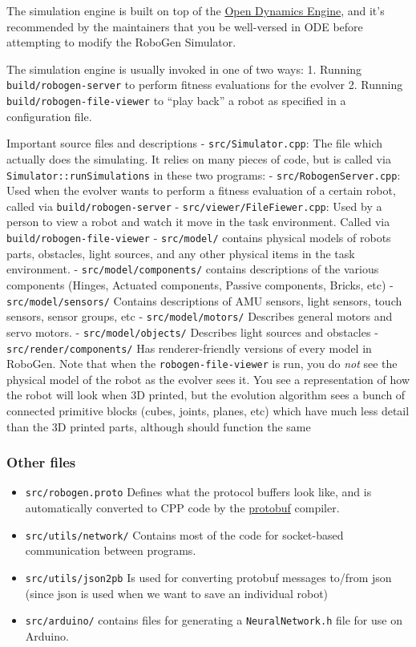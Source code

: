 The simulation engine is built on top of the
\href{http://www.ode.org/}{Open Dynamics Engine}, and it's recommended
by the maintainers that you be well-versed in ODE before attempting to
modify the RoboGen Simulator.

The simulation engine is usually invoked in one of two ways: 1. Running
\texttt{build/robogen-server} to perform fitness evaluations for the
evolver 2. Running \texttt{build/robogen-file-viewer} to ``play back'' a
robot as specified in a configuration file.

Important source files and descriptions - \texttt{src/Simulator.cpp}:
The file which actually does the simulating. It relies on many pieces of
code, but is called via \texttt{Simulator::runSimulations} in these two
programs: - \texttt{src/RobogenServer.cpp}: Used when the evolver wants
to perform a fitness evaluation of a certain robot, called via
\texttt{build/robogen-server} - \texttt{src/viewer/FileFiewer.cpp}: Used
by a person to view a robot and watch it move in the task environment.
Called via \texttt{build/robogen-file-viewer} - \texttt{src/model/}
contains physical models of robots parts, obstacles, light sources, and
any other physical items in the task environment. -
\texttt{src/model/components/} contains descriptions of the various
components (Hinges, Actuated components, Passive components, Bricks,
etc) - \texttt{src/model/sensors/} Contains descriptions of AMU sensors,
light sensors, touch sensors, sensor groups, etc -
\texttt{src/model/motors/} Describes general motors and servo motors. -
\texttt{src/model/objects/} Describes light sources and obstacles -
\texttt{src/render/components/} Has renderer-friendly versions of every
model in RoboGen. Note that when the \texttt{robogen-file-viewer} is
run, you do \emph{not} see the physical model of the robot as the
evolver sees it. You see a representation of how the robot will look
when 3D printed, but the evolution algorithm sees a bunch of connected
primitive blocks (cubes, joints, planes, etc) which have much less
detail than the 3D printed parts, although should function the same

\hypertarget{other-files}{%
\subsubsection{Other files}\label{other-files}}

\begin{itemize}
\item
  \texttt{src/robogen.proto} Defines what the protocol buffers look
  like, and is automatically converted to CPP code by the
  \href{https://developers.google.com/protocol-buffers/docs/cpptutorial}{protobuf}
  compiler.
\item
  \texttt{src/utils/network/} Contains most of the code for socket-based
  communication between programs.
\item
  \texttt{src/utils/json2pb} Is used for converting protobuf messages
  to/from json (since json is used when we want to save an individual
  robot)
\item
  \texttt{src/arduino/} contains files for generating a
  \texttt{NeuralNetwork.h} file for use on Arduino.
\end{itemize}

